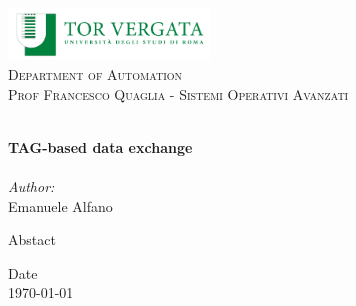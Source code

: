 \begin{titlepage}
\vbox{ }
\vbox{ }
\begin{center}
\includegraphics[width=0.40\textwidth]{Images/Logo-Universita-Roma-Tor-Vergata.png}\\[1cm]
\textsc{\LARGE Department of Automation}\\[1.5cm]
\textsc{\Large Prof Francesco Quaglia - Sistemi Operativi Avanzati}\\[0.5cm]
\vbox{ }

\HRule \\[0.4cm]
{\huge \bfseries TAG-based data exchange}\\[0.4cm]
\HRule \\[1.5cm]

\large
\emph{Author:}\\
Emanuele Alfano

{Abstact}

\vfill



{Date\\ \large \today}

\end{center}
\end{titlepage}
